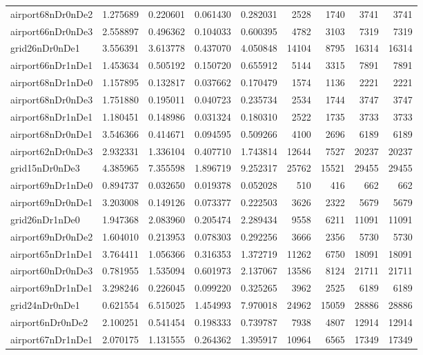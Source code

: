 \begin{longtable}{|l|r|r|r|r|r|r|r|r|}
airport68nDr0nDe2 & 1.275689 & 0.220601 & 0.061430 & 0.282031 & 2528 & 1740 & 3741 & 3741 \\
airport66nDr0nDe3 & 2.558897 & 0.496362 & 0.104033 & 0.600395 & 4782 & 3103 & 7319 & 7319 \\
grid26nDr0nDe1 & 3.556391 & 3.613778 & 0.437070 & 4.050848 & 14104 & 8795 & 16314 & 16314 \\
airport66nDr1nDe1 & 1.453634 & 0.505192 & 0.150720 & 0.655912 & 5144 & 3315 & 7891 & 7891 \\
airport68nDr1nDe0 & 1.157895 & 0.132817 & 0.037662 & 0.170479 & 1574 & 1136 & 2221 & 2221 \\
airport68nDr0nDe3 & 1.751880 & 0.195011 & 0.040723 & 0.235734 & 2534 & 1744 & 3747 & 3747 \\
airport68nDr1nDe1 & 1.180451 & 0.148986 & 0.031324 & 0.180310 & 2522 & 1735 & 3733 & 3733 \\
airport68nDr0nDe1 & 3.546366 & 0.414671 & 0.094595 & 0.509266 & 4100 & 2696 & 6189 & 6189 \\
airport62nDr0nDe3 & 2.932331 & 1.336104 & 0.407710 & 1.743814 & 12644 & 7527 & 20237 & 20237 \\
grid15nDr0nDe3 & 4.385965 & 7.355598 & 1.896719 & 9.252317 & 25762 & 15521 & 29455 & 29455 \\
airport69nDr1nDe0 & 0.894737 & 0.032650 & 0.019378 & 0.052028 & 510 & 416 & 662 & 662 \\
airport69nDr0nDe1 & 3.203008 & 0.149126 & 0.073377 & 0.222503 & 3626 & 2322 & 5679 & 5679 \\
grid26nDr1nDe0 & 1.947368 & 2.083960 & 0.205474 & 2.289434 & 9558 & 6211 & 11091 & 11091 \\
airport69nDr0nDe2 & 1.604010 & 0.213953 & 0.078303 & 0.292256 & 3666 & 2356 & 5730 & 5730 \\
airport65nDr1nDe1 & 3.764411 & 1.056366 & 0.316353 & 1.372719 & 11262 & 6750 & 18091 & 18091 \\
airport60nDr0nDe3 & 0.781955 & 1.535094 & 0.601973 & 2.137067 & 13586 & 8124 & 21711 & 21711 \\
airport69nDr1nDe1 & 3.298246 & 0.226045 & 0.099220 & 0.325265 & 3962 & 2525 & 6189 & 6189 \\
grid24nDr0nDe1 & 0.621554 & 6.515025 & 1.454993 & 7.970018 & 24962 & 15059 & 28886 & 28886 \\
airport6nDr0nDe2 & 2.100251 & 0.541454 & 0.198333 & 0.739787 & 7938 & 4807 & 12914 & 12914 \\
airport67nDr1nDe1 & 2.070175 & 1.131555 & 0.264362 & 1.395917 & 10964 & 6565 & 17349 & 17349 \\

\end{longtable}
